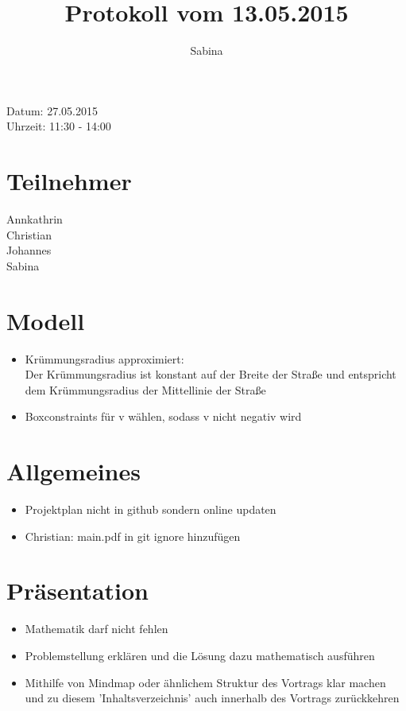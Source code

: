 \documentclass[12pt,a4paper]{article}
\theoremstyle{definition}
\theoremstyle{plain}
\begin{document}
	
\title{Protokoll vom 13.05.2015}
\author{Sabina}
\maketitle

\noindent Datum: 27.05.2015\\
Uhrzeit: 11:30 - 14:00


\section{Teilnehmer}
Annkathrin\\
Christian\\
Johannes\\
Sabina

\section{Modell}
\begin{itemize}
\item Krümmungsradius approximiert:\\
Der Krümmungsradius ist konstant auf der Breite der Straße  und entspricht dem Krümmungsradius der Mittellinie der Straße
\item Boxconstraints für v wählen, sodass v nicht negativ wird
\end{itemize}

\section{Allgemeines}
\begin{itemize}
\item Projektplan nicht in github sondern online updaten
\item Christian: main.pdf in git ignore hinzufügen
\end{itemize}

\section{Präsentation}
\begin{itemize}
\item Mathematik darf nicht fehlen
\item Problemstellung erklären und die Lösung dazu mathematisch ausführen
\item Mithilfe von Mindmap oder ähnlichem Struktur des Vortrags klar machen und zu diesem 'Inhaltsverzeichnis' auch innerhalb des Vortrags zurückkehren 
\end{itemize}
\end{document}
